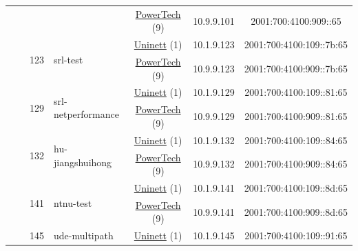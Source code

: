 \begin{small}
\begin{center}
\begin{longtable}{|c|c|c|c|c|c|c|c|}
  &  & \multicolumn{2}{|c|}{} & \multicolumn{2}{|c|}{\tiny{\href{http://www.powertech.no}{PowerTech} (9)}} & \tiny{10.9.9.101} & \tiny{2001:700:4100:909::65} \\* \cline{3-3}\cline{4-4}\cline{5-5}\cline{6-6}\cline{7-7}\cline{8-8}
  &  & \multirow{2}{*}{\tiny{123}} & \multicolumn{1}{|l|}{\multirow{2}{*}{\tiny{srl-test}}} & \multicolumn{2}{|c|}{\tiny{\href{https://www.uninett.no}{Uninett} (1)}} & \tiny{10.1.9.123} & \tiny{2001:700:4100:109::7b:65} \\* \cline{5-5}\cline{6-6}\cline{7-7}\cline{8-8}
  &  &  &  & \multicolumn{2}{|c|}{\tiny{\href{http://www.powertech.no}{PowerTech} (9)}} & \tiny{10.9.9.123} & \tiny{2001:700:4100:909::7b:65} \\* \cline{3-3}\cline{4-4}\cline{5-5}\cline{6-6}\cline{7-7}\cline{8-8}
  &  & \multirow{2}{*}{\tiny{129}} & \multicolumn{1}{|l|}{\multirow{2}{*}{\tiny{srl-netperformance}}} & \multicolumn{2}{|c|}{\tiny{\href{https://www.uninett.no}{Uninett} (1)}} & \tiny{10.1.9.129} & \tiny{2001:700:4100:109::81:65} \\* \cline{5-5}\cline{6-6}\cline{7-7}\cline{8-8}
  &  &  &  & \multicolumn{2}{|c|}{\tiny{\href{http://www.powertech.no}{PowerTech} (9)}} & \tiny{10.9.9.129} & \tiny{2001:700:4100:909::81:65} \\* \cline{3-3}\cline{4-4}\cline{5-5}\cline{6-6}\cline{7-7}\cline{8-8}
  &  & \multirow{2}{*}{\tiny{132}} & \multicolumn{1}{|l|}{\multirow{2}{*}{\tiny{hu-jiangshuihong}}} & \multicolumn{2}{|c|}{\tiny{\href{https://www.uninett.no}{Uninett} (1)}} & \tiny{10.1.9.132} & \tiny{2001:700:4100:109::84:65} \\* \cline{5-5}\cline{6-6}\cline{7-7}\cline{8-8}
  &  &  &  & \multicolumn{2}{|c|}{\tiny{\href{http://www.powertech.no}{PowerTech} (9)}} & \tiny{10.9.9.132} & \tiny{2001:700:4100:909::84:65} \\* \cline{3-3}\cline{4-4}\cline{5-5}\cline{6-6}\cline{7-7}\cline{8-8}
  &  & \multirow{2}{*}{\tiny{141}} & \multicolumn{1}{|l|}{\multirow{2}{*}{\tiny{ntnu-test}}} & \multicolumn{2}{|c|}{\tiny{\href{https://www.uninett.no}{Uninett} (1)}} & \tiny{10.1.9.141} & \tiny{2001:700:4100:109::8d:65} \\* \cline{5-5}\cline{6-6}\cline{7-7}\cline{8-8}
  &  &  &  & \multicolumn{2}{|c|}{\tiny{\href{http://www.powertech.no}{PowerTech} (9)}} & \tiny{10.9.9.141} & \tiny{2001:700:4100:909::8d:65} \\* \cline{3-3}\cline{4-4}\cline{5-5}\cline{6-6}\cline{7-7}\cline{8-8}
  &  & \multirow{2}{*}{\tiny{145}} & \multicolumn{1}{|l|}{\multirow{2}{*}{\tiny{ude-multipath}}} & \multicolumn{2}{|c|}{\tiny{\href{https://www.uninett.no}{Uninett} (1)}} & \tiny{10.1.9.145} & \tiny{2001:700:4100:109::91:65} \\* \cline{5-5}\cline{6-6}\cline{7-7}\cline{8-8}

\end{longtable}
\end{center}
\end{small}
